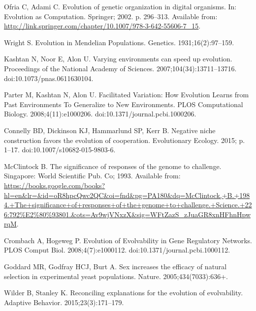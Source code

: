 \documentclass[10pt,letterpaper,final]{article}
\begin{document}
\begin{thebibliography}{10}
Ofria C, Adami C.
\newblock Evolution of genetic organization in digital organisms.
\newblock In: Evolution as {Computation}. Springer; 2002. p. 296--313.
\newblock Available from:
  \url{http://link.springer.com/chapter/10.1007/978-3-642-55606-7_15}.

Wright S.
\newblock Evolution in {Mendelian} {Populations}.
\newblock Genetics. 1931;16(2):97--159.

Kashtan N, Noor E, Alon U.
\newblock Varying environments can speed up evolution.
\newblock Proceedings of the National Academy of Sciences.
  2007;104(34):13711--13716.
\newblock doi:{10.1073/pnas.0611630104}.

Parter M, Kashtan N, Alon U.
\newblock Facilitated {Variation}: {How} {Evolution} {Learns} from {Past}
  {Environments} {To} {Generalize} to {New} {Environments}.
\newblock PLOS Computational Biology. 2008;4(11):e1000206.
\newblock doi:{10.1371/journal.pcbi.1000206}.

Connelly BD, Dickinson KJ, Hammarlund SP, Kerr B.
\newblock Negative niche construction favors the evolution of cooperation.
\newblock Evolutionary Ecology. 2015; p. 1--17.
\newblock doi:{10.1007/s10682-015-9803-6}.

McClintock B.
\newblock The significance of responses of the genome to challenge.
\newblock Singapore: World Scientific Pub. Co; 1993.
\newblock Available from:
  \url{https://books.google.com/books?hl=en&lr=&id=oR8hpcQwc2QC&oi=fnd&pg=PA180&dq=McClintock,+B.+1984.+The+significance+of+responses+of+the+genome+to+challenge.+Science.+226:792%E2%80%93801.&ots=Av9wjVNxzX&sig=WFtZazS_zJuaGR8xnHFhnHpwrqM}.

Crombach A, Hogeweg P.
\newblock Evolution of {Evolvability} in {Gene} {Regulatory} {Networks}.
\newblock PLOS Comput Biol. 2008;4(7):e1000112.
\newblock doi:{10.1371/journal.pcbi.1000112}.

Goddard MR, Godfray HCJ, Burt A.
\newblock Sex increases the efficacy of natural selection in experimental yeast
  populations.
\newblock Nature. 2005;434(7033):636+.

Wilder B, Stanley K.
\newblock Reconciling explanations for the evolution of evolvability.
\newblock Adaptive Behavior. 2015;23(3):171--179.


\end{thebibliography}
\end{document}
